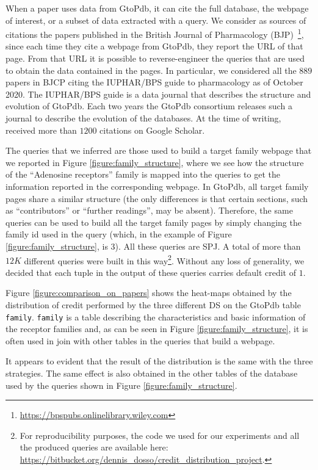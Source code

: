 When a paper uses data from GtoPdb, it can cite the full database, the webpage of interest, or a subset of data extracted with a query. 
We consider as sources of citations the papers published in the British Journal of Pharmacology (BJP)~\footnote{\url{https://bpspubs.onlinelibrary.wiley.com}}, since each time they cite a webpage from GtoPdb, they report the URL of that page. From that URL it is possible to reverse-engineer the queries that are used to obtain the data contained in the pages. 
In particular, we considered all the $889$ papers in BJCP citing the IUPHAR/BPS guide to pharmacology \citep{iuphar2018} as of October 2020. The IUPHAR/BPS guide is a data journal that describes the structure and evolution of GtoPdb. Each two years the GtoPdb consortium releases such a journal to describe the evolution of the databases.
At the time of writing, \citep{iuphar2018} received more than $1200$ citations on Google Scholar. 

The queries that we inferred are those used to build a target family webpage that we reported in Figure \ref{figure:family_structure}, where we see how the structure of the ``Adenosine receptors'' family is mapped into the queries to get the information reported in the corresponding webpage. 
In GtoPdb, all target family pages share a similar structure (the only differences is that certain sections, such as ``contributors'' or ``further readings'', may be absent).
Therefore, the same queries can be used to build all the target family pages by simply changing the family id used in the query (which, in the example of Figure \ref{figure:family_structure}, is 3). All these queries are SPJ. 
A total of more than $12K$ different queries were built in this way\footnote{For reproducibility purposes, the code we used for our experiments and all the produced queries are available here: \url{https://bitbucket.org/dennis_dosso/credit_distribution_project}.}.
Without any loss of generality, we decided that each tuple in the output of these queries carries default credit of $1$.

Figure \ref{figure:comparison_on_papers} shows the heat-maps obtained by the distribution of credit performed by the three different DS on the GtoPdb table \texttt{family}.
\texttt{family} is a table describing the characteristics and basic information of the receptor families and, as can be seen in Figure \ref{figure:family_structure}, it is often used in join with other tables in the queries that build a webpage.

It appears to evident that the result of the distribution is the same with the three strategies. The same effect is also obtained in the other tables of the database used by the queries shown in Figure \ref{figure:family_structure}. 

